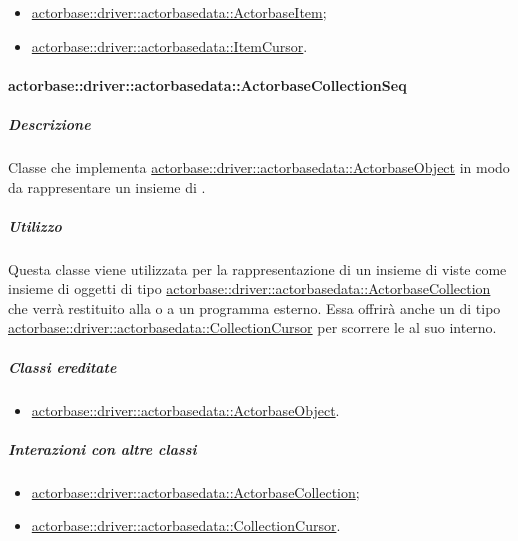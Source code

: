 \documentclass{scalatekids-article}
\begin{document}
\begin{itemize}
\item \hyperref[sec:actorbase::driver::actorbasedata::ActorbaseItem]{actorbase::driver::actorbasedata::ActorbaseItem};
\item \hyperref[sec:actorbase::driver::actorbasedata::ItemCursor]{actorbase::driver::actorbasedata::ItemCursor}.
\end{itemize}

\paragraph{actorbase::driver::actorbasedata::ActorbaseCollectionSeq}
\label{sec:actorbase::driver::actorbasedata::ActorbaseCollectionSeq}

\subparagraph{Descrizione}

Classe che implementa \hyperref[sec:actorbase::driver::actorbasedata::ActorbaseObject]{actorbase::driver::actorbasedata::ActorbaseObject}
in modo da rappresentare un insieme di .

\subparagraph{Utilizzo}

Questa classe viene utilizzata per la rappresentazione di un insieme di
 viste come insieme di oggetti di tipo
\hyperref[sec:actorbase::driver::actorbasedata::ActorbaseCollection]{actorbase::driver::actorbasedata::ActorbaseCollection}
che verrà restituito alla  o a un programma esterno.
Essa offrirà anche un  di tipo
\hyperref[sec:actorbase::driver::actorbasedata::CollectionCursor]{actorbase::driver::actorbasedata::CollectionCursor}
per scorrere le  al suo interno.

\subparagraph{Classi ereditate}

\begin{itemize}
\item \hyperref[sec:actorbase::driver::actorbasedata::ActorbaseObject]{actorbase::driver::actorbasedata::ActorbaseObject}.
\end{itemize}

\subparagraph{Interazioni con altre classi}

\begin{itemize}
\item \hyperref[sec:actorbase::driver::actorbasedata::ActorbaseCollection]{actorbase::driver::actorbasedata::ActorbaseCollection};
\item \hyperref[sec:actorbase::driver::actorbasedata::CollectionCursor]{actorbase::driver::actorbasedata::CollectionCursor}.
\end{itemize}
\end{document}
